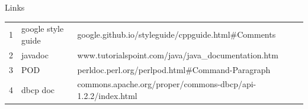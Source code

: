 \documentclass[letterpaper,11pt]{texMemo} %
\begin{document}
  \begin{center}
    Links
  \end{center}
  \begin{tabular}{ l l l }
    1 & google style guide & google.github.io/styleguide/cppguide.html\#Comments\\
    2 & javadoc & www.tutorialspoint.com/java/java\_documentation.htm\\
    3 & POD & perldoc.perl.org/perlpod.html\#Command-Paragraph \\
    4 & dbcp doc & commons.apache.org/proper/commons-dbcp/api-1.2.2/index.html
  \end{tabular}

\end{document}
